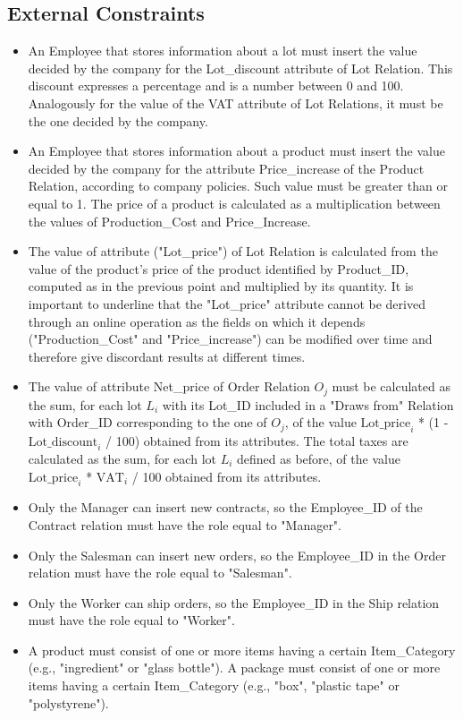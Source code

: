 \subsection{External Constraints}
\begin{itemize}
\item An Employee that stores information about a lot must insert the value decided by the company for the Lot\_discount attribute of Lot Relation. This discount expresses a percentage and is a number between 0 and 100. Analogously for the value of the VAT attribute of Lot Relations, it must be the one decided by the company.
\item An Employee that stores information about a product must insert the value decided by the company for the attribute Price\_increase of the Product Relation, according to company policies. Such value must be greater than or equal to 1. The price of a product is calculated as a multiplication between the values of Production\_Cost and Price\_Increase.
\item The value of attribute ("Lot\_price") of Lot Relation is calculated from the value of the product's price of the product identified by Product\_ID, computed as in the previous point and multiplied by its quantity. It is important to underline that the "Lot\_price" attribute cannot be derived through an online operation as the fields on which it depends ("Production\_Cost" and "Price\_increase") can be modified over time and therefore give discordant results at different times.
\item The value of attribute Net\_price of Order Relation $O_j$ must be calculated as the sum, for each lot $L_i$ with its Lot\_ID included in a "Draws from" Relation with Order\_ID corresponding to the one of $O_j$, of the value $ \mathrm{Lot\_price}_i $ * (1 - $ \mathrm{Lot\_discount}_i $ / 100) obtained from its attributes. The total taxes are calculated as the sum, for each lot $L_i$ defined as before, of the value $ \mathrm{Lot\_price}_i $ * $ \mathrm{VAT}_i $ / 100 obtained from its attributes.
\item Only the Manager can insert new contracts, so the Employee\_ID of the Contract relation must have the role equal to "Manager". 
\item Only the Salesman can insert new orders, so the Employee\_ID in the Order relation must have the role equal to "Salesman". 
\item Only the Worker can ship orders, so the Employee\_ID in the Ship relation must have the role equal to "Worker".
\item A product must consist of one or more items having a certain Item\_Category (e.g., "ingredient" or "glass bottle"). A package must consist of one or more items having a certain Item\_Category (e.g., "box", "plastic tape" or "polystyrene"). 

\end{itemize}
